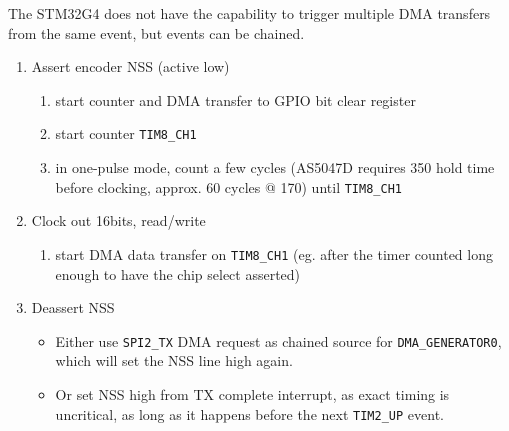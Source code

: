 \documentclass[12pt,a4paper,oneside,openany]{article}
\begin{document}
The STM32G4 does not have the capability to trigger multiple DMA transfers from the same event, but events can be chained.

\begin{enumerate}
\item Assert encoder NSS (active low)
    \begin{enumerate}
    \item start counter and DMA transfer to GPIO bit clear register
    \item start counter \texttt{TIM8\_CH1}
    \item in one-pulse mode, count a few cycles (AS5047D requires \unit{350}{\nano\second} hold time before clocking, approx. 60 cycles @ \unit{170}{\mega\hertz}) until \texttt{TIM8\_CH1}
    \end{enumerate}
\item Clock out 16bits, read/write
    \begin{enumerate}
    \item start DMA data transfer on \texttt{TIM8\_CH1} (eg. after the timer counted long enough to have the chip select asserted)
    \end{enumerate}
\item Deassert NSS
    \begin{itemize}
    \item Either use \texttt{SPI2\_TX} DMA request as chained source for \texttt{DMA\_GENERATOR0}, which will set the NSS line high again.
    \item Or set NSS high from TX complete interrupt, as exact timing is uncritical, as long as it happens before the next \texttt{TIM2\_UP} event.
    \end{itemize}
\end{enumerate}
\end{document}
